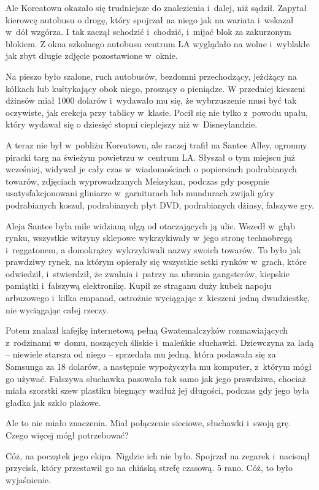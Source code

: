 \documentclass[oneside,polish,11pt,rmheadings]{mwbk}
\begin{document}
Ale Koreatown okazało się trudniejsze do znalezienia i~dalej, niż sądził. Zapytał kierowcę autobusu o drogę, który spojrzał na niego jak na wariata i~wskazał w~dół wzgórza. I tak zaczął schodzić i~chodzić, i~mijać blok za zakurzonym blokiem. Z okna szkolnego autobusu centrum LA wyglądało na wolne i~wyblakłe jak zbyt długie zdjęcie pozostawione w~oknie. 


Na pieszo było szalone, ruch autobusów, bezdomni przechodzący, jeżdżący na kółkach lub kuśtykający obok niego, proszący o pieniądze. W przedniej kieszeni dżinsów miał 1000 dolarów i~wydawało mu się, że wybrzuszenie musi być tak oczywiste, jak erekcja przy tablicy w~klasie. Pocił się nie tylko z~powodu upału, który wydawał się o dziesięć stopni cieplejszy niż w~Disneylandzie. 


A teraz nie był w~pobliżu Koreatown, ale raczej trafił na Santee Alley, ogromny piracki targ na świeżym powietrzu w~centrum LA. Słyszał o tym miejscu już wcześniej, widywał je cały czas w~wiadomościach o popiersiach podrabianych towarów, zdjęciach wyprowadzanych Meksykan, podczas gdy posępnie usatysfakcjonowani gliniarze w~garniturach lub mundurach zwijali góry podrabianych koszul, podrabianych płyt DVD, podrabianych dżinsy, fałszywe gry. 


Aleja Santee była mile widzianą ulgą od otaczających ją ulic. Wszedł w~głąb rynku, wszystkie witryny sklepowe wykrzykiwały w~jego stronę technobregą i~reggatonem, a domokrążcy wykrzykiwali nazwy swoich towarów. To było jak prawdziwy rynek, na którym opierały się wszystkie setki rynków w~grach, które odwiedził, i~stwierdził, że zwalnia i~patrzy na ubrania gangsterów, kiepskie pamiątki i~fałszywą elektronikę. Kupił ze straganu duży kubek napoju arbuzowego i~kilka empanad, ostrożnie wyciągając z~kieszeni jedną dwudziestkę, nie wyciągając całej rzeczy. 


Potem znalazł kafejkę internetową pełną Gwatemalczyków rozmawiających z~rodzinami w~domu, noszących śliskie i~maleńkie słuchawki. Dziewczyna za ladą -- niewiele starsza od niego -- sprzedała mu jedną, która podawała się za Samsunga za 18 dolarów, a następnie wypożyczyła mu komputer, z~którym mógł go używać. Fałszywa słuchawka pasowała tak samo jak jego prawdziwa, chociaż miała szorstki szew plastiku biegnący wzdłuż jej długości, podczas gdy jego była gładka jak szkło plażowe. 


Ale to nie miało znaczenia. Miał połączenie sieciowe, słuchawki i~swoją grę. Czego więcej mógł potrzebować? 


Cóż, na początek jego ekipa. Nigdzie ich nie było. Spojrzał na zegarek i~nacisnął przycisk, który przestawił go na chińską strefę czasową. 5 rano. Cóż, to było wyjaśnienie. 
\end{document}
